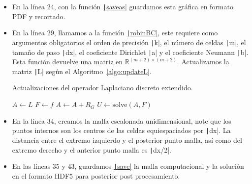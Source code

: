 \begin{problem}
\begin{itemize}
      \item

            En la línea $24$, con la función
            \href{https://docs.octave.org/latest/Printing-and-Saving-Plots.html}{\texttt|saveas|}
            guardamos esta gráfica en formato PDF y recortado.

      \item

            En la línea $29$, llamamos a la función
            \href{https://carlosal1015.github.io/mole_examples/api_docs/matlab/src/matlab/robinBC.html}{\texttt|robinBC|},
            este requiere como argumentos obligatorios el orden de
            precisión \texttt|k|, el número  de celdas
            \texttt|m|, el tamaño de paso
            \texttt|dx|, el coeficiente Dirichlet
            \texttt|a| y el coeficiente Neumann
            \texttt|b|.
            Esta función devuelve una matriz en
            \begin{math}
                  \mathbb{R}^{\left(m+2\right)\times\left(m+2\right)}
            \end{math}.
            Actualizamos la matriz \texttt|L| según el
            Algoritmo~\ref{algo:updateL}.

            \begin{algorithm}[H]
                  \caption{Actualizaciones del operador Laplaciano discreto extendido.}\label{algo:updateL}
                  $A\leftarrow L$\;
                  $F\leftarrow f$\;
                  $A\leftarrow A+R_{G}$\;
                  $U\leftarrow \text{solve}\left(A, F\right)$\;
            \end{algorithm}

      \item

            En la línea $34$, creamos la malla escalonada
            unidimensional, note que los puntos internos son los
            centros de las celdas equiespaciados por
            \texttt|dx|.
            La distancia entre el extremo izquierdo y el posterior
            punto malla, así como del extremo derecho y el anterior
            punto malla es \texttt|dx/2|.

      \item

            En las líneas $35$ y $43$, guardamos
            \href{https://docs.octave.org/latest/Simple-File-I_002fO.html#index-save-6}{\texttt|save|}
            la malla computacional y la solución en el formato HDF5
            para posterior post procesamiento.


\end{itemize}
\end{problem}
